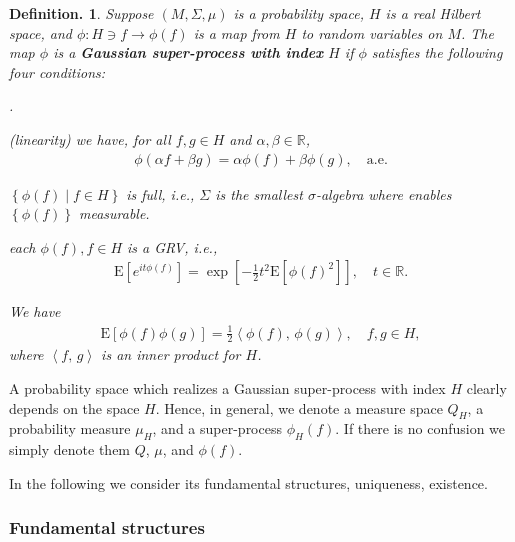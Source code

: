 \documentclass[openany, a4paper, oneside]{jsbook}
\newcounter{enum2}
\renewenvironment{enumerate}{%
\begin{list}%
{%
\arabic{enum2}.\ \,%
}%
{%
\usecounter{enum2}
\setlength{\itemindent}{0pt}%
\setlength{\leftmargin}{15pt}%
\setlength{\rightmargin}{0pt}%
\setlength{\labelsep}{0pt}%
\setlength{\labelwidth}{6pt}%
\setlength{\itemsep}{0pt}%
\setlength{\parsep}{0pt}%
\setlength{\listparindent}{0pt}%
}
}{%
\end{list}%
}
\theoremstyle{break}
\theoremstyle{breakdefn}
\newtheorem{defn}[thm]{Definition.}
\newcommand{\sqbk}[1]{\left[#1\right]}
\newcommand{\cbk}[1]{\left\{#1\right\}}
\newcommand{\bkt}[2]{\left\langle#1,\,#2\right\rangle}
\newcommand{\relmiddle}[1]{\mathrel{}\middle#1\mathrel{}}
\newcommand{\set}[2]{\left\{#1 \relmiddle| #2\right\}}
\newcommand{\bbR}{\mathbb{R}}
\newcommand{\E}[1]{\rmE\sqbk{#1}}
\newcommand{\rmE}{\mathrm{E}}
\begin{document}
\begin{defn}
 Suppose $(M, \Sigma, \mu)$ is a probability space, $H$ is a real Hilbert space,
 and $\phi \colon H \ni f \to \phi (f)$ is a map from $H$ to random variables on $M$.
 The map $\phi$ is a \textbf{Gaussian super-process with index} $H$ if $\phi$ satisfies
 the following four conditions:
\begin{enumerate}
\item (linearity) we have, for all $f, g \in H$ and $\alpha, \beta \in \bbR$,
  \begin{align}
   \phi (\alpha f + \beta g) = \alpha \phi (f) + \beta \phi (g), \quad \mathrm{a.e.}
  \end{align}
\item $\set{\phi (f)}{f \in H}$ is full, i.e., $\Sigma$ is the smallest $\sigma$-algebra where enables $\cbk{\phi (f)}$ measurable.
\item each $\phi (f), f \in H$ is a GRV, i.e.,
  \begin{align}
   \E{e^{it \phi (f)}} = \exp \sqbk{- \frac{1}{2} t^2 \E{\phi (f)^2}}, \quad t \in \bbR.
  \end{align}
\item We have
  \begin{align}
   \E{\phi (f) \phi (g)} = \frac{1}{2} \bkt{\phi (f)}{\phi (g)}, \quad f, g \in H,
  \end{align}
  where $\bkt{f}{g}$ is an inner product for $H$.
\end{enumerate}
\end{defn}
A probability space which realizes a Gaussian super-process with index $H$ clearly depends on the space $H$.
Hence, in general, we denote a measure space $Q_{H}$, a probability measure $\mu_{H}$, and a super-process $\phi_{H}(f)$.
If there is no confusion we simply denote them $Q$, $\mu$, and $\phi (f)$.

In the following we consider its fundamental structures, uniqueness, existence.
\subsubsection{Fundamental structures}
\end{document}
